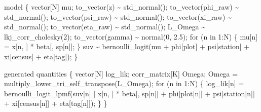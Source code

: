 \documentclass[
  12pt,
  letterpaper,
  DIV=11,
  numbers=noendperiod]{scrartcl}
\newenvironment{Shaded}{\begin{snugshade}}{\end{snugshade}}
\newcommand{\ControlFlowTok}[1]{\textcolor[rgb]{0.00,0.23,0.31}{#1}}
\newcommand{\DataTypeTok}[1]{\textcolor[rgb]{0.68,0.00,0.00}{#1}}
\newcommand{\DecValTok}[1]{\textcolor[rgb]{0.68,0.00,0.00}{#1}}
\newcommand{\FloatTok}[1]{\textcolor[rgb]{0.68,0.00,0.00}{#1}}
\newcommand{\KeywordTok}[1]{\textcolor[rgb]{0.00,0.23,0.31}{#1}}
\newcommand{\NormalTok}[1]{\textcolor[rgb]{0.00,0.23,0.31}{#1}}
\begin{document}
\begin{Shaded}
\begin{Highlighting}[]
\KeywordTok{model}\NormalTok{ \{}
  \DataTypeTok{vector}\NormalTok{[N] mu;}
\NormalTok{  to\_vector(z) \textasciitilde{} std\_normal();}
\NormalTok{  to\_vector(phi\_raw) \textasciitilde{} std\_normal();}
\NormalTok{  to\_vector(psi\_raw) \textasciitilde{} std\_normal();}
\NormalTok{  to\_vector(xi\_raw) \textasciitilde{} std\_normal();}
\NormalTok{  to\_vector(eta\_raw) \textasciitilde{} std\_normal();}
\NormalTok{  L\_Omega \textasciitilde{} lkj\_corr\_cholesky(}\DecValTok{2}\NormalTok{);}
\NormalTok{  to\_vector(gamma) \textasciitilde{} normal(}\DecValTok{0}\NormalTok{, }\FloatTok{2.5}\NormalTok{);}
  \ControlFlowTok{for}\NormalTok{ (n }\ControlFlowTok{in} \DecValTok{1}\NormalTok{:N) \{}
\NormalTok{    mu[n] = x[n, ] * beta[, sp[n]];}
\NormalTok{  \}}
\NormalTok{  suv \textasciitilde{} bernoulli\_logit(mu + phi[plot] + psi[station] + xi[census] + eta[tag]);}
\NormalTok{\}}

\KeywordTok{generated quantities}\NormalTok{ \{}
  \DataTypeTok{vector}\NormalTok{[N] log\_lik;}
  \DataTypeTok{corr\_matrix}\NormalTok{[K] Omega;}
\NormalTok{  Omega = multiply\_lower\_tri\_self\_transpose(L\_Omega);}
  \ControlFlowTok{for}\NormalTok{ (n }\ControlFlowTok{in} \DecValTok{1}\NormalTok{:N) \{}
\NormalTok{    log\_lik[n] = bernoulli\_logit\_lpmf(suv[n] | x[n, ] * beta[, sp[n]] +}
\NormalTok{      phi[plot[n]] + psi[station[n]] + xi[census[n]] + eta[tag[n]]);}
\NormalTok{  \}}
\NormalTok{\}}
\end{Highlighting}
\end{Shaded}
\end{document}
